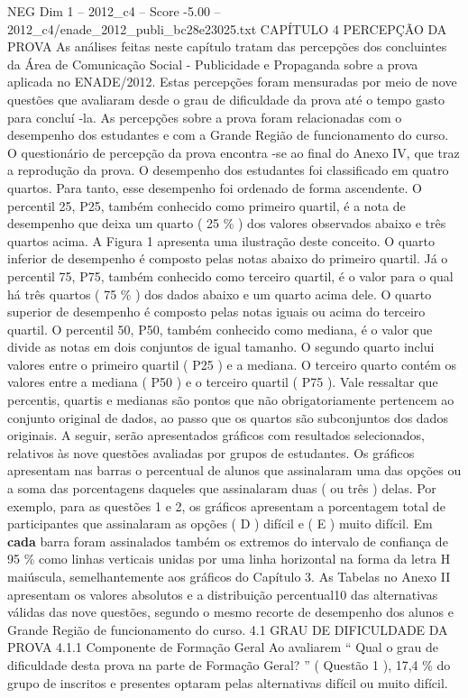 \begin{textsample}{NEG Dim 1 – 2012\_c4 – Score -5.00 – 2012\_c4/enade\_2012\_publi\_bc28e23025.txt}  \label{ex:f1_neg_076}
CAPÍTULO 4 PERCEPÇÃO DA PROVA As análises feitas neste capítulo tratam das percepções dos concluintes da Área de Comunicação Social - Publicidade e Propaganda sobre a prova aplicada no ENADE/2012.
Estas percepções foram mensuradas por meio de nove questões que avaliaram desde o grau de dificuldade da prova até o tempo gasto para concluí -la.
As percepções sobre a prova foram relacionadas com o desempenho dos estudantes e com a Grande Região de funcionamento do curso.
O questionário de percepção da prova encontra -se ao final do Anexo IV, que traz a reprodução da prova.
O desempenho dos estudantes foi classificado em quatro quartos.
Para tanto, esse desempenho foi ordenado de forma ascendente.
O percentil 25, P25, também conhecido como primeiro quartil, é a nota de desempenho que deixa um quarto ( 25 \% ) dos valores observados abaixo e três quartos acima.
A Figura 1 apresenta uma ilustração deste conceito.
O quarto inferior de desempenho é composto pelas notas abaixo do primeiro quartil.
Já o percentil 75, P75, também conhecido como terceiro quartil, é o valor para o qual há três quartos ( 75 \% ) dos dados abaixo e um quarto acima dele.
O quarto superior de desempenho é composto pelas notas iguais ou acima do terceiro quartil.
O percentil 50, P50, também conhecido como mediana, é o valor que divide as notas em dois conjuntos de igual tamanho.
O segundo quarto inclui valores entre o primeiro quartil ( P25 ) e a mediana.
O terceiro quarto contém os valores entre a mediana ( P50 ) e o terceiro quartil ( P75 ).
Vale ressaltar que percentis, quartis e medianas são pontos que não obrigatoriamente pertencem ao conjunto original de dados, ao passo que os quartos são subconjuntos dos dados originais.
A seguir, serão apresentados gráficos com resultados selecionados, relativos às nove questões avaliadas por grupos de estudantes.
Os gráficos apresentam nas barras o percentual de alunos que assinalaram uma das opções ou a soma das porcentagens daqueles que assinalaram duas ( ou três ) delas.
Por exemplo, para as questões 1 e 2, os gráficos apresentam a porcentagem total de participantes que assinalaram as opções ( D ) difícil e ( E ) muito difícil.
Em \textbf{cada} barra foram assinalados também os extremos do intervalo de confiança de 95 \% como linhas verticais unidas por uma linha horizontal na forma da letra H maiúscula, semelhantemente aos gráficos do Capítulo 3.
As Tabelas no Anexo II apresentam os valores absolutos e a distribuição percentual10 das alternativas válidas das nove questões, segundo o mesmo recorte de desempenho dos alunos e Grande Região de funcionamento do curso. 4.1 GRAU DE DIFICULDADE DA PROVA 4.1.1 Componente de Formação Geral Ao avaliarem “ Qual o grau de dificuldade desta prova na parte de Formação Geral? ” ( Questão 1 ), 17,4 \% do grupo de inscritos e presentes optaram pelas alternativas difícil ou muito difícil.

\end{textsample}
